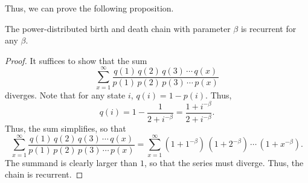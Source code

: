 Thus, we can prove the following proposition.
\begin{proposition}
    The power-distributed birth and death chain with parameter $\beta$ is recurrent for any $\beta$.
\end{proposition}
\begin{proof}
    It suffices to show that the sum
    \[
        \sum_{x = 1}^{\infty} \frac{q(1)\,q(2)\,q(3)\,\cdots\,q(x)}{p(1)\,p(2)\,p(3)\,\cdots\,p(x)}
    \]
    diverges. Note that for any state $i$, $q(i) = 1-p(i)$. Thus,
    \[
        q(i) = 1 - \frac{1}{2 + i^{-\beta}} = \frac{1 + i^{-\beta}}{2 + i^{-\beta}}.  
    \]
    Thus, the sum simplifies, so that
    \[
        \sum_{x = 1}^{\infty} \frac{q(1)\,q(2)\,q(3)\,\cdots\,q(x)}{p(1)\,p(2)\,p(3)\,\cdots\,p(x)} =
        \sum_{x = 1}^{\infty} (1+1^{-\beta})\,(1+2^{-\beta})\,\cdots\,(1 + x^{-\beta}).
    \]
    The summand is clearly larger than $1$, so that the series must diverge. Thus, the chain is
    recurrent.
\end{proof}

